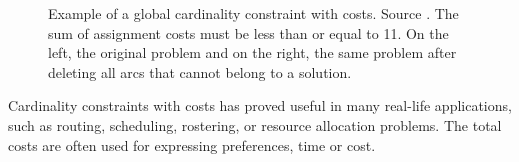 \begin{figure}[h!]
\begin{subfigure}[t]{0.4\columnwidth}
        \label{fig:introSuppr}
    \end{subfigure}

    \caption{Example of a global cardinality constraint with costs. 
    Source \protect\cite{Regin:CostbasedArcConsistencyforGlobalCardinalityConstraints}. 
    The sum of assignment costs must be less than or equal to 11. On the left, the original problem and on the right, the same problem after deleting all arcs that cannot belong to a solution.
    }
    
    
    \label{fig:intro}
\end{figure}


Cardinality constraints with costs has proved useful in
many real-life applications, such as routing, scheduling, 
rostering, or resource allocation problems.
The total costs are often used for expressing preferences, time or cost.

